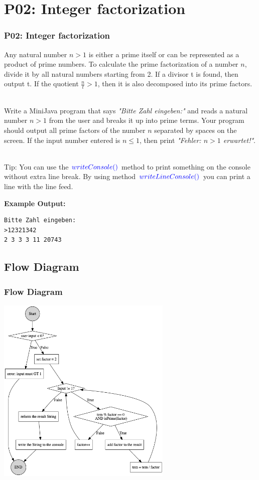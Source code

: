 \documentclass[handout, navsym]{tum-presentation}
\numberwithin{equation}{section}
\begin{document}
\section{P02: Integer factorization}
\begin{frame}[fragile]
\frametitle{P02: Integer factorization}
\vspace*{\fill} \large
Any natural number $n > 1$ is either a prime itself or can be represented as a product of prime numbers. To calculate the prime factorization of a number $n$, divide it by all natural numbers starting from 2. If a divisor t is found, then output t. If the quotient $\frac{n}{t} > 1$, then it is also decomposed into its prime factors.\par
~\\
Write a MiniJava program that says\textsl{ \color{blue}"Bitte Zahl eingeben:"} and reads a natural number $n > 1$ from the user and breaks it up into prime terms. Your program should output all prime factors of the number $n$ separated by spaces on the screen. If the input number entered is $n \leq 1$, then print \textsl{\color{blue}"Fehler: $n >1$ erwartet!"}.\par
~\\
Tip: You can use the $\color{blue}writeConsole ()$ method to print something on the console without extra line break. By using method $\color{blue}writeLineConsole()$ you can print a line with the line feed.\par
\bigskip
\textbf{\large Example Output:}
\begin{lstlisting}
Bitte Zahl eingeben:
>12321342
2 3 3 3 11 20743
\end{lstlisting}
\vspace*{\fill}

\end{frame}

\subsection{Flow Diagram}
\begin{frame}[fragile]
\frametitle{Flow Diagram}

\center \includegraphics[height=9cm]{p2.png}

\end{frame}
\end{document}
